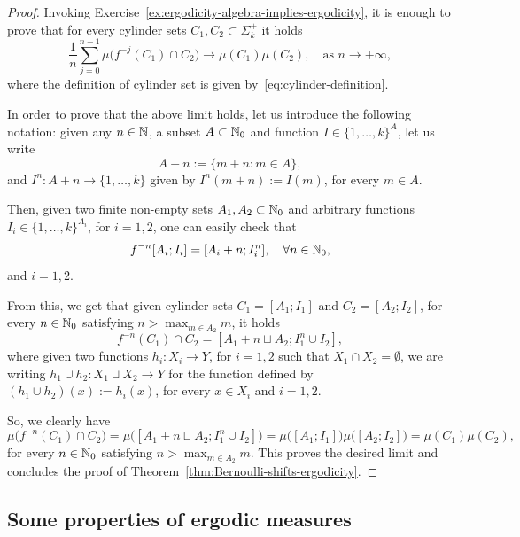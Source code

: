 \begin{proof}
  Invoking Exercise~\ref{ex:ergodicity-algebra-implies-ergodicity}, it is enough to prove that for every cylinder sets $C_1,C_2\subset\Sigma_k^+$ it holds
  \begin{displaymath}
    \frac{1}{n}\sum_{j=0}^{n-1}\mu\big(f^{-j}(C_1)\cap C_2\big) \to \mu(C_1)\mu(C_2), \quad\text{as } n\to+\infty,
  \end{displaymath}
  where the definition of cylinder set is given by~\eqref{eq:cylinder-definition}.

  In order to prove that the above limit holds, let us introduce the following notation: given any $n\in\mathbb{N}$, a subset $A\subset\mathbb{N}_0$ and function $I\in\{1,\ldots,k\}^A$,  let us write
  \begin{displaymath}
    A+n:=\{m+n : m\in A\},
  \end{displaymath}
  and $I^n\colon A+n\to\{1,\ldots,k\}$ given by $I^n(m+n):=I(m)$, for every $m\in A$.

  Then, given two finite non-empty sets $A_1,A_2\subset\mathbb{N}_0$ and arbitrary functions $I_i\in\{1,\ldots,k\}^{A_i}$, for $i=1,2$, one can easily check that
  \begin{displaymath}
    f^{-n}[A_i;I_i] = [A_i+n;I_i^n], \quad\forall n\in\mathbb{N}_0,
  \end{displaymath}
  and $i=1,2$.

  From this, we get that given cylinder sets $C_1=[A_1;I_1]$ and $C_2=[A_2;I_2]$, for every $n\in\mathbb{N}_0$ satisfying $n>\max_{m\in A_2} m$, it holds
  \begin{displaymath}
    f^{-n}(C_1)\cap C_2 = [A_1+n \sqcup A_2; I_1^n\cup I_2],
  \end{displaymath}
  where given two functions $h_i\colon X_i\to Y$, for $i=1,2$ such that $X_1\cap X_2=\emptyset$, we are writing $h_1\cup h_2\colon X_1\sqcup X_2\to Y$ for the function defined by $(h_1\cup h_2)(x):=h_i(x)$, for every $x\in X_i$ and $i=1,2$.

  So, we clearly have
  \begin{displaymath}
    \mu\big(f^{-n}(C_1)\cap C_2\big) = \mu\big([A_1+n \sqcup A_2; I_1^n\cup I_2]\big) = \mu\big([A_1;I_1]\big)\mu\big([A_2;I_2]\big) = \mu(C_1)\mu(C_2),
  \end{displaymath}
  for every $n\in\mathbb{N}_0$ satisfying $n>\max_{m\in A_2} m$. This proves the desired limit and concludes the proof of Theorem~\ref{thm:Bernoulli-shifts-ergodicity}.
\end{proof}


\subsection{Some properties of ergodic measures}\label{sec:ergodic-measures-extreme-points}

